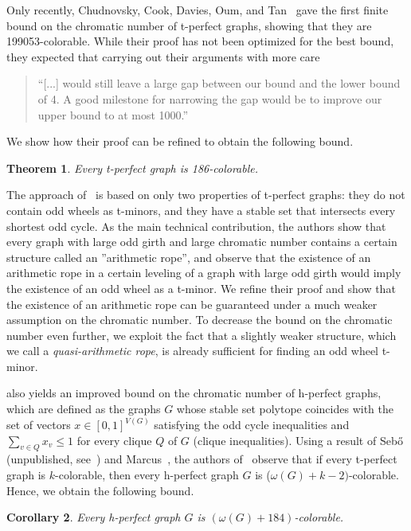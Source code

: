 \documentclass{article}
\newtheorem{theorem}{Theorem}[section]
\newtheorem{corollary}[theorem]{Corollary}
\begin{document}
Only recently, Chudnovsky, Cook, Davies, Oum, and Tan~\cite{chudnovsky2024colouringtperfectgraphs} gave the first finite bound on the chromatic number of t-perfect graphs, showing that they are 199053-colorable.
While their proof has not been optimized for the best bound, they expected that carrying out their arguments with more care
\begin{quote}
    ``[...] would still leave a large gap between our bound and the lower bound of 4. A good milestone for narrowing the gap would be to improve our upper bound to at most 1000.''
\end{quote}
We show how their proof can be refined to obtain the following bound.

\begin{theorem}\label{thm:main}
    Every t-perfect graph is 186-colorable.
\end{theorem}

The approach of~\cite{chudnovsky2024colouringtperfectgraphs} is based on only two properties of t-perfect graphs: they do not contain odd wheels as t-minors, and they have a stable set that intersects every shortest odd cycle.
As the main technical contribution, the authors show that every graph with large odd girth and large chromatic number contains a certain structure called an ''arithmetic rope'', and observe that the existence of an arithmetic rope in a certain leveling of a graph with large odd girth would imply the existence of an odd wheel as a t-minor.
We refine their proof and show that the existence of an arithmetic rope can be guaranteed under a much weaker assumption on the chromatic number.
To decrease the bound on the chromatic number even further, we exploit the fact that a slightly weaker structure, which we call a \emph{quasi-arithmetic rope}, is already sufficient for finding an odd wheel t-minor.

 also yields an improved bound on the chromatic number of h-perfect graphs, which are defined as the graphs $G$ whose stable set polytope coincides with the set of vectors $x \in [0,1]^{V(G)}$ satisfying the odd cycle inequalities and $\sum_{v \in Q} x_v \leq 1$ for every clique $Q$ of $G$ (clique inequalities).
Using a result of Sebő (unpublished, see~\cite{bruhn2012claw}) and Marcus~\cite{marcus1996shortestoddcycles}, the authors of~\cite[Thm. 1.2]{chudnovsky2024colouringtperfectgraphs} observe that if every t-perfect graph is $k$-colorable, then every h-perfect graph $G$ is ($\omega(G) + k - 2)$-colorable.
Hence, we obtain the following bound.
\begin{corollary}
    Every h-perfect graph $G$ is $(\omega(G) + 184)$-colorable.
\end{corollary}
\end{document}
